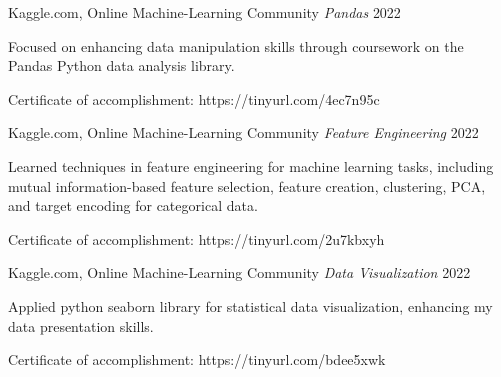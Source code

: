 \begin{cventries}
  \cventry
  {Kaggle.com, Online Machine-Learning Community} %
  {\textit{Pandas}}
  {} %
  {2022} %
  {
    \begin{cvitems} %
      \item {Focused on enhancing data manipulation skills through coursework on the Pandas Python data analysis library.}
      \item {Certificate of accomplishment: https://tinyurl.com/4ec7n95c}
    \end{cvitems}
  }
  \newline
  \cventry
  {Kaggle.com, Online Machine-Learning Community} %
  {\textit{Feature Engineering}}
  {} %
  {2022} %
  {
    \begin{cvitems} %
      \item {Learned techniques in feature engineering for machine learning tasks, including mutual information-based feature selection, feature creation, clustering, PCA, and target encoding for categorical data.}
      \item {Certificate of accomplishment: https://tinyurl.com/2u7kbxyh}
    \end{cvitems}
  }
  \newline

\cventry
{Kaggle.com, Online Machine-Learning Community} %
{\textit{Data Visualization}}
{} %
{2022} %
{
  \begin{cvitems} %
    \item {Applied python seaborn library for statistical data visualization, enhancing my data presentation skills.}
    \item {Certificate of accomplishment: https://tinyurl.com/bdee5xwk}
  \end{cvitems}
}
\newline



\end{cventries}
